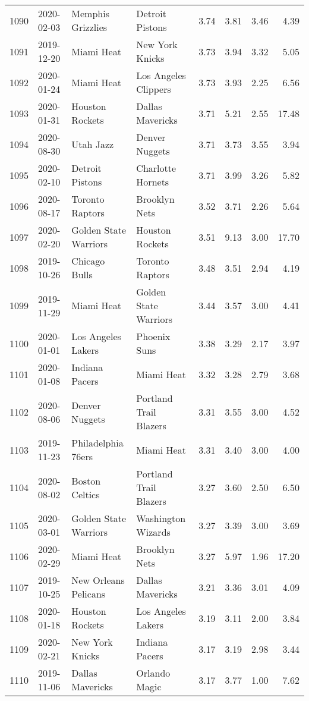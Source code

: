 \documentclass[
  11pt,
]{article}
\theoremstyle{nonumberplain}
\begin{document}
\begin{longtable}{rl|llr|rrr}
1090 & 2020-02-03 & Memphis Grizzlies & Detroit Pistons & 3.74 & 3.81 & 3.46 & 4.39\\
1091 & 2019-12-20 & Miami Heat & New York Knicks & 3.73 & 3.94 & 3.32 & 5.05\\
1092 & 2020-01-24 & Miami Heat & Los Angeles Clippers & 3.73 & 3.93 & 2.25 & 6.56\\
1093 & 2020-01-31 & Houston Rockets & Dallas Mavericks & 3.71 & 5.21 & 2.55 & 17.48\\
1094 & 2020-08-30 & Utah Jazz & Denver Nuggets & 3.71 & 3.73 & 3.55 & 3.94\\
1095 & 2020-02-10 & Detroit Pistons & Charlotte Hornets & 3.71 & 3.99 & 3.26 & 5.82\\
1096 & 2020-08-17 & Toronto Raptors & Brooklyn Nets & 3.52 & 3.71 & 2.26 & 5.64\\
1097 & 2020-02-20 & Golden State Warriors & Houston Rockets & 3.51 & 9.13 & 3.00 & 17.70\\
1098 & 2019-10-26 & Chicago Bulls & Toronto Raptors & 3.48 & 3.51 & 2.94 & 4.19\\
1099 & 2019-11-29 & Miami Heat & Golden State Warriors & 3.44 & 3.57 & 3.00 & 4.41\\
1100 & 2020-01-01 & Los Angeles Lakers & Phoenix Suns & 3.38 & 3.29 & 2.17 & 3.97\\
1101 & 2020-01-08 & Indiana Pacers & Miami Heat & 3.32 & 3.28 & 2.79 & 3.68\\
1102 & 2020-08-06 & Denver Nuggets & Portland Trail Blazers & 3.31 & 3.55 & 3.00 & 4.52\\
1103 & 2019-11-23 & Philadelphia 76ers & Miami Heat & 3.31 & 3.40 & 3.00 & 4.00\\
1104 & 2020-08-02 & Boston Celtics & Portland Trail Blazers & 3.27 & 3.60 & 2.50 & 6.50\\
1105 & 2020-03-01 & Golden State Warriors & Washington Wizards & 3.27 & 3.39 & 3.00 & 3.69\\
1106 & 2020-02-29 & Miami Heat & Brooklyn Nets & 3.27 & 5.97 & 1.96 & 17.20\\
1107 & 2019-10-25 & New Orleans Pelicans & Dallas Mavericks & 3.21 & 3.36 & 3.01 & 4.09\\
1108 & 2020-01-18 & Houston Rockets & Los Angeles Lakers & 3.19 & 3.11 & 2.00 & 3.84\\
1109 & 2020-02-21 & New York Knicks & Indiana Pacers & 3.17 & 3.19 & 2.98 & 3.44\\
1110 & 2019-11-06 & Dallas Mavericks & Orlando Magic & 3.17 & 3.77 & 1.00 & 7.62\\

\end{longtable}
\end{document}
